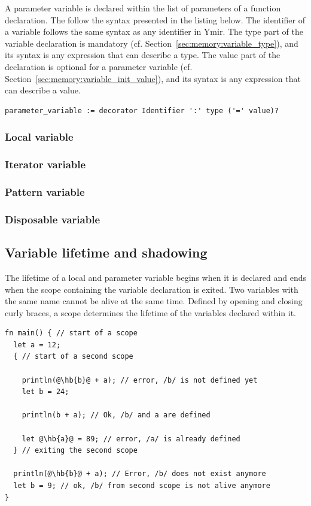 A parameter variable is declared within the list of parameters of a function
declaration. The follow the syntax presented in the listing below. The
identifier of a variable follows the same syntax as any identifier in Ymir. The
type part of the variable declaration is mandatory (cf.
Section~\ref{sec:memory:variable_type}), and its syntax is any expression that can
describe a type. The value part of the declaration is optional for a parameter
variable (cf. Section~\ref{sec:memory:variable_init_value}), and its syntax is any
expression that can describe a value.

\begin{lstlisting}[style=bashVerb]
parameter_variable := decorator Identifier ':' type ('=' value)?
\end{lstlisting}

\subsubsection*{Local variable}
\subsubsection*{Iterator variable}
\subsubsection*{Pattern variable}
\subsubsection*{Disposable variable}

\subsection{Variable lifetime and shadowing}

The lifetime of a local and parameter variable begins when it is declared and
ends when the scope containing the variable declaration is exited. Two variables
with the same name cannot be alive at the same time. Defined by opening and
closing curly braces, a scope determines the lifetime of the variables declared
within it.

\begin{lstlisting}[style=coloredverbatimError, escapechar=@]
fn main() { // start of a scope
  let a = 12;
  { // start of a second scope

    println(@\hb{b}@ + a); // error, /b/ is not defined yet
    let b = 24;

    println(b + a); // Ok, /b/ and a are defined

    let @\hb{a}@ = 89; // error, /a/ is already defined
  } // exiting the second scope

  println(@\hb{b}@ + a); // Error, /b/ does not exist anymore
  let b = 9; // ok, /b/ from second scope is not alive anymore
}
\end{lstlisting}


